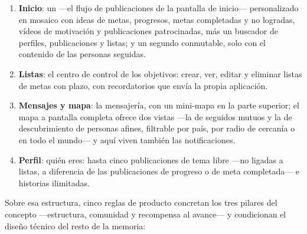 \begin{enumerate}
  \item \textbf{Inicio}: un  —el flujo de publicaciones de la pantalla de inicio— personalizado en mosaico con ideas de metas, progresos, metas completadas y no logradas, vídeos de motivación y publicaciones patrocinadas, más un buscador de perfiles, publicaciones y listas; y un segundo  conmutable, solo con el contenido de las personas seguidas.
  \item \textbf{Listas}: el centro de control de los objetivos: crear, ver, editar y eliminar listas de metas con plazo, con recordatorios que envía la propia aplicación.
  \item \textbf{Mensajes y mapa}: la mensajería, con un mini-mapa en la parte superior; el mapa a pantalla completa ofrece dos vistas —la de seguidos mutuos y la de descubrimiento de personas afines, filtrable por país, por radio de cercanía o en todo el mundo— y aquí viven también las notificaciones.
  \item \textbf{Perfil}: quién eres: hasta cinco publicaciones de tema libre —no ligadas a listas, a diferencia de las publicaciones de progreso o de meta completada— e historias ilimitadas.
\end{enumerate}

Sobre esa estructura, cinco reglas de producto concretan los tres pilares del concepto —estructura, comunidad y recompensa al avance— y condicionan el diseño técnico del resto de la memoria:

